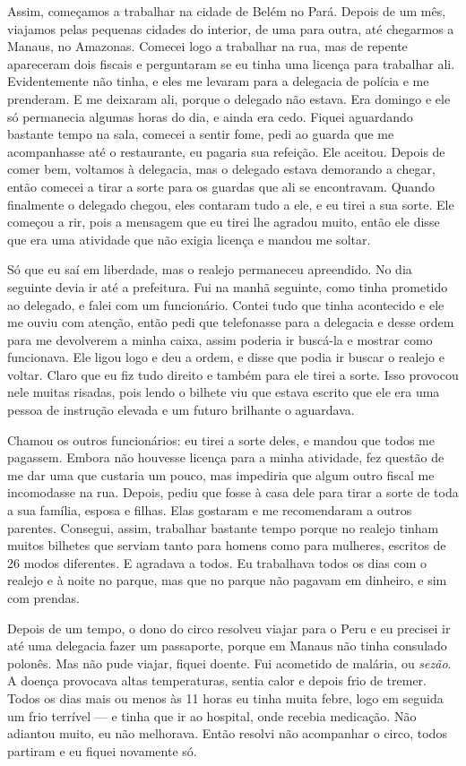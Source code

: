 Assim, começamos a trabalhar na cidade de Belém no Pará. Depois de um
mês, viajamos pelas pequenas cidades do interior, de uma para
outra, até chegarmos a Manaus, no Amazonas. Comecei logo a trabalhar na
rua, mas de repente apareceram dois fiscais e perguntaram se eu tinha uma
licença para trabalhar ali. Evidentemente não tinha, e eles me
levaram para a delegacia de polícia e me prenderam. E me deixaram ali,
porque o delegado não estava. Era domingo e ele só permanecia algumas
horas do dia, e ainda era cedo. Fiquei aguardando bastante tempo na
sala, comecei a sentir fome, pedi ao guarda que me acompanhasse até o
restaurante, eu pagaria sua refeição. Ele aceitou. Depois de comer
bem, voltamos à delegacia, mas o delegado estava demorando a chegar,
então comecei a tirar a sorte para os guardas que ali se encontravam.
Quando finalmente o delegado chegou, eles contaram tudo a ele, e eu
tirei a sua sorte. Ele começou a rir, pois a mensagem que eu tirei lhe
agradou muito, então ele disse que era uma atividade que não exigia
licença e mandou me soltar.

Só que eu saí em liberdade, mas o realejo permaneceu apreendido. No dia
seguinte devia ir até a prefeitura. Fui na manhã seguinte, como tinha
prometido ao delegado, e falei com um funcionário. Contei tudo que tinha
acontecido e ele me ouviu com atenção, então pedi que telefonasse para a
delegacia e desse ordem para me devolverem a minha caixa, assim poderia
ir buscá-la e mostrar como funcionava. Ele ligou logo e deu a ordem, e
disse que podia ir buscar o realejo e voltar. Claro que eu fiz tudo
direito e também para ele tirei a sorte. Isso provocou nele muitas
risadas, pois lendo o bilhete viu que estava escrito que ele era uma
pessoa de instrução elevada e um futuro brilhante o aguardava.

Chamou os outros funcionários: eu tirei a sorte deles, e mandou
que todos me pagassem. Embora não houvesse licença para a minha
atividade, fez questão de me dar uma que custaria um pouco, mas
impediria que algum outro fiscal me incomodasse na rua. Depois, pediu que
fosse à casa dele para tirar a sorte de toda a sua família, esposa e
filhas. Elas gostaram e me recomendaram a outros parentes. Consegui, assim,
trabalhar bastante tempo porque no realejo tinham muitos bilhetes que
serviam tanto para homens como para mulheres, escritos de 26 
modos diferentes. E agradava a todos. Eu trabalhava
todos os dias com o realejo e à noite no parque, mas que no parque não
pagavam em dinheiro, e sim com prendas.

Depois de um tempo, o dono do circo resolveu viajar para o Peru e eu precisei 
ir até uma delegacia fazer um passaporte, porque em
Manaus não tinha consulado polonês. Mas não pude viajar, fiquei
doente. Fui acometido de malária, ou \textit{sezão}. A doença
provocava altas temperaturas, sentia calor e depois frio de tremer.
Todos os dias mais ou menos às 11 horas eu tinha muita febre, logo em
seguida um frio terrível --- e tinha que ir ao hospital, onde recebia
medicação. Não adiantou muito, eu não melhorava. Então resolvi não
acompanhar o circo, todos partiram e eu fiquei novamente só.

